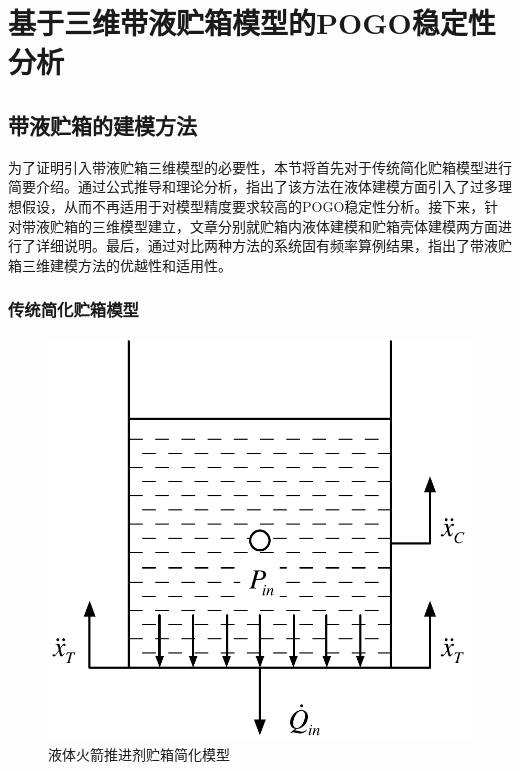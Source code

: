 
\chapter{基于三维带液贮箱模型的POGO稳定性分析}

\section{带液贮箱的建模方法}
\label{sec:3D-Liquid-Tank-Modelling}
为了证明引入带液贮箱三维模型的必要性，本节将首先对于传统简化贮箱模型进行简要介绍。通过公式推导和理论分析，指出了该方法在液体建模方面引入了过多理想假设，从而不再适用于对模型精度要求较高的POGO稳定性分析。接下来，针对带液贮箱的三维模型建立，文章分别就贮箱内液体建模和贮箱壳体建模两方面进行了详细说明。最后，通过对比两种方法的系统固有频率算例结果，指出了带液贮箱三维建模方法的优越性和适用性。

\subsection{传统简化贮箱模型}

\begin{figure}[!htb]
  \centering
  \includegraphics[width=.45\linewidth]{Simplified-Tank-Model.pdf}
  \caption{液体火箭推进剂贮箱简化模型}\label{Simplified-Tank-Model}
\end{figure}

